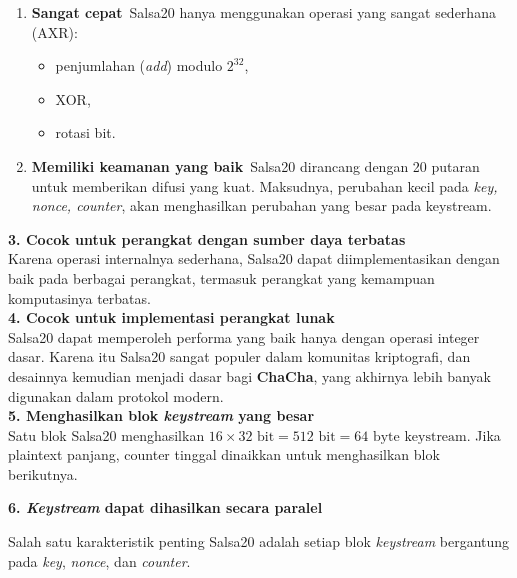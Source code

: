 \documentclass{article}
\begin{document}
\begin{enumerate}
    \item \textbf{Sangat cepat}\
    Salsa20 hanya menggunakan operasi yang sangat sederhana (AXR):
    \begin{itemize}
        \item penjumlahan (\textit{add}) modulo $2^{32}$,
        \item XOR,
        \item rotasi bit.
    \end{itemize}

    \item \textbf{Memiliki keamanan yang baik}\
    Salsa20 dirancang dengan 20 putaran untuk memberikan difusi yang kuat. Maksudnya, perubahan kecil pada \textit{key, nonce, counter}, akan menghasilkan perubahan yang besar pada keystream.
\end{enumerate}

\newpage


\textbf{3. Cocok untuk perangkat dengan sumber daya terbatas}\\ Karena operasi internalnya sederhana, Salsa20 dapat diimplementasikan dengan baik pada berbagai perangkat, termasuk perangkat yang kemampuan komputasinya terbatas.\\
\vspace{5mm}
\textbf{4. Cocok untuk implementasi perangkat lunak}\\ Salsa20 dapat memperoleh performa yang baik hanya dengan operasi integer dasar. Karena itu Salsa20 sangat populer dalam komunitas kriptografi, dan desainnya kemudian menjadi dasar bagi \textbf{ChaCha}, yang akhirnya lebih banyak digunakan dalam protokol modern.\\
\vspace{5mm}
\textbf{5. Menghasilkan blok \textit{keystream} yang besar}\\ Satu blok Salsa20 menghasilkan $16 \times 32 \text{ bit} = 512 \text{ bit} = 64 \text{ byte keystream}$. Jika plaintext panjang, counter tinggal dinaikkan untuk menghasilkan blok berikutnya.

\newpage


\textbf{6. \textit{Keystream} dapat dihasilkan secara paralel}

Salah satu karakteristik penting Salsa20 adalah setiap blok \textit{keystream} bergantung pada \textit{key}, \textit{nonce}, dan \textit{counter}.
\end{document}
